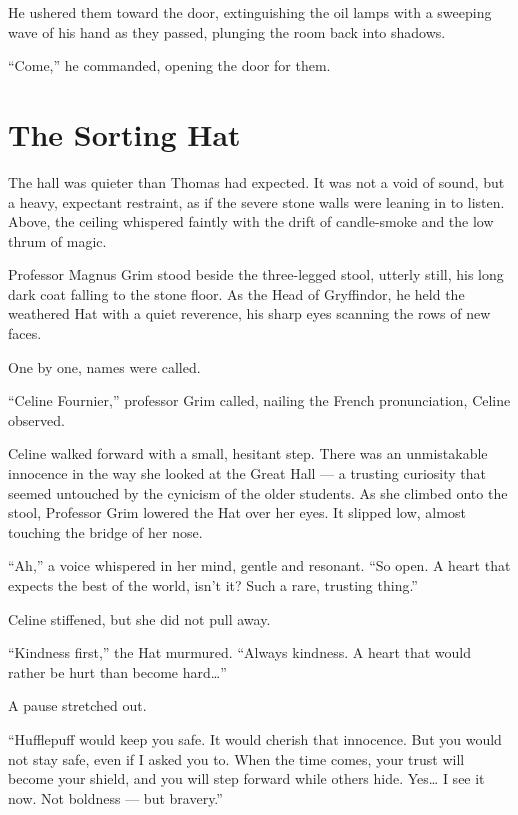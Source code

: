 He ushered them toward the door, extinguishing the oil lamps with a sweeping wave of his hand as they passed, plunging the room back into shadows.
 
\enquote{Come,} he commanded, opening the door for them.
 
\section*{The Sorting Hat}
 
The hall was quieter than Thomas had expected. It was not a void of sound, but a heavy, expectant restraint, as if the severe stone walls were leaning in to listen. Above, the ceiling whispered faintly with the drift of candle-smoke and the low thrum of magic.
 
Professor Magnus Grim stood beside the three-legged stool, utterly still, his long dark coat falling to the stone floor. As the Head of Gryffindor, he held the weathered Hat with a quiet reverence, his sharp eyes scanning the rows of new faces.
 
One by one, names were called.

\vspace{1.5\baselineskip}

\enquote{Celine Fournier,} professor Grim called, nailing the French pronunciation, Celine observed.

Celine walked forward with a small, hesitant step. There was an unmistakable innocence in the way she looked at the Great Hall --- a trusting curiosity that seemed untouched by the cynicism of the older students. As she climbed onto the stool, Professor Grim lowered the Hat over her eyes. It slipped low, almost touching the bridge of her nose.
 
\enquote{Ah,} a voice whispered in her mind, gentle and resonant. \enquote{So open. A heart that expects the best of the world, isn't it? Such a rare, trusting thing.}
 
Celine stiffened, but she did not pull away.
 
\enquote{Kindness first,} the Hat murmured. \enquote{Always kindness. A heart that would rather be hurt than become hard\ldots{}}
 
A pause stretched out.
 
\enquote{Hufflepuff would keep you safe. It would cherish that innocence. But you would not stay safe, even if I asked you to. When the time comes, your trust will become your shield, and you will step forward while others hide. Yes\ldots{} I see it now. Not boldness --- but bravery.}
 
